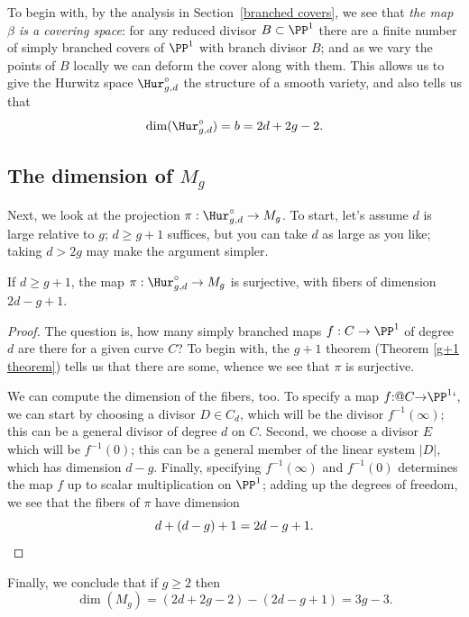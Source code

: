 To begin with, by the analysis in Section~\ref{branched covers}, we
see that \emph{the map $\beta$ is a covering space}: for any reduced
divisor $B \subset \PP^1$ there are a finite number of simply branched
covers of $\PP^1$ with branch divisor $B$; and as we vary the points
of $B$ locally we can deform the cover along with them. This allows us
to give the Hurwitz space $\Hur^\circ_{g,d}$ the structure of a smooth
variety, and also tells us that
$$
\vspace*{-4pt}
\dim(\Hur^\circ_{g,d}) = b = 2d+2g-2.
\vspace*{-4pt}
$$

\subsection*{The dimension of $M_g$}

Next, we look at the projection $\pi : \Hur^\circ_{g,d} \to M_g$. To
%
start, let's assume $d$ is large relative to $g$; $d \geq g+1$
suffices, but you can take $d$ as large as you like; taking $d > 2g$
may make the argument simpler.

\begin{proposition}
If $d \geq g+1$, the map $\pi :
\Hur^\circ_{g,d} \to M_g$ is surjective, with fibers of dimension $2d-g+1$.
\end{proposition}

\begin{proof}
The question is, how many simply branched maps $f : C \to \PP^1$ of
degree $d$ are there
for a given curve $C$?
To begin with, the
$g+1$ theorem
%
(Theorem \ref{g+1 theorem}) tells us that
there are some, whence we see that $\pi$ is surjective.

We can compute the dimension of the fibers, too.
\kern-1pt To specify a map
$f {:}@ C {\to} \PP^1`$,
we can start by choosing a divisor $D \in C_d$, which
will be the divisor $f^{-1}(\infty)$; this can be a general divisor of
degree $d$ on $C$. Second, we choose a divisor $E$ which will be
$f^{-1}(0)$; this can be a general member of the linear system $|D|$,
which has dimension $d-g$. Finally, specifying $f^{-1}(\infty)$ and
$f^{-1}(0)$ determines the map $f$ up to scalar multiplication on
$\PP^1$; adding up the degrees of freedom, we see that the fibers of
$\pi$ have dimension
$$
d + (d-g) + 1 = 2d-g+1.
\qed
$$
\let\qed\relax
\end{proof}

Finally, we conclude that if $g\geq2$ then
$$
\dim(M_g) = (2d+2g-2) - (2d - g + 1) = 3g-3.
$$

